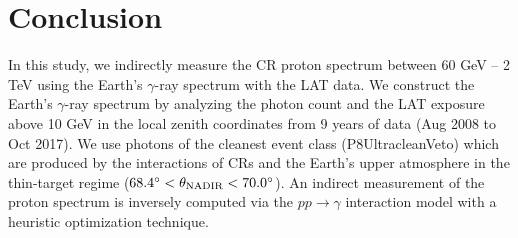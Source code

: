 \chapter{Conclusion}


In this study,
we indirectly measure the CR proton spectrum between 60 GeV -- 2 TeV
using the Earth's $\gamma$-ray spectrum with the LAT data.
We construct the Earth's $\gamma$-ray spectrum by analyzing
the photon count and the LAT exposure above 10 GeV in
the local zenith coordinates from 9 years of data (Aug 2008 to Oct 2017).
We use photons of the cleanest event class (P8UltracleanVeto)
which are produced by the interactions of CRs and
the Earth's upper atmosphere in the thin-target regime
($68.4^\circ<\theta_{\rm NADIR}<70.0^\circ$).
An indirect measurement 
of the proton spectrum is inversely computed via the
$pp\rightarrow\gamma$ interaction model with a heuristic optimization
technique.








